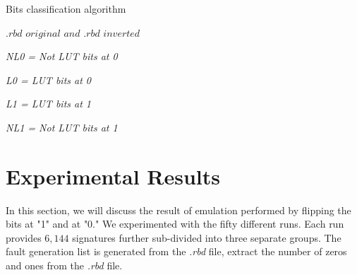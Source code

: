 \begin{algorithm}
\caption{Bits classification algorithm}
\begin{algorithmic}
\label{BCA}
\REQUIRE $.rbd$ $original$ $and$ $.rbd$ $inverted$ \\
\vspace{0.20 cm }

\vspace{0.10 cm }

\STATE \textit{ NL0 = Not LUT bits at 0}
\vspace{0.10 cm }

\vspace{0.10 cm }

\STATE \textit{ L0 = LUT bits at 0}
\vspace{0.10 cm }

\vspace{0.10 cm }

\STATE \textit{ L1 =  LUT bits at 1}
\vspace{0.10 cm }

\vspace{0.10 cm }

\STATE \textit{ NL1 = Not LUT bits at 1}
\vspace{0.10 cm }




\ENDIF
\vspace{0.20 cm }

\end{algorithmic}
\end{algorithm}






\section{Experimental Results}
\label{Experimental Results}

In this section, we will discuss the result of emulation performed by flipping the bits at "1" and at "0." We experimented with the fifty different runs. Each run provides $6,144$ signatures further sub-divided into three separate groups.  The fault generation list is generated from the \textit{.rbd} file, extract the number of zeros and ones from the \textit{.rbd} file.

